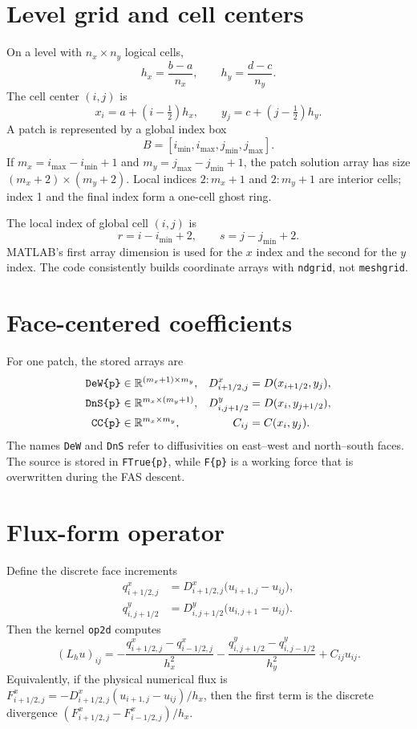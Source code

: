\documentclass[11pt,oneside,openany]{book}
\newcommand{\code}[1]{\textnormal{\texttt{#1}}}
\newcommand{\R}{\mathbb{R}}
\begin{document}
\section{Level grid and cell centers}
On a level with $n_x\times n_y$ logical cells,
\[
  h_x=\frac{b-a}{n_x},\qquad h_y=\frac{d-c}{n_y}.
\]
The cell center $(i,j)$ is
\[
  x_i=a+\left(i-\tfrac12\right)h_x,
  \qquad
  y_j=c+\left(j-\tfrac12\right)h_y.
\]
A patch is represented by a global index box
\[
  B=[i_{\min},i_{\max},j_{\min},j_{\max}].
\]
If $m_x=i_{\max}-i_{\min}+1$ and $m_y=j_{\max}-j_{\min}+1$, the patch solution array has size $(m_x+2)\times(m_y+2)$. Local indices $2{:}m_x+1$ and $2{:}m_y+1$ are interior cells; index 1 and the final index form a one-cell ghost ring.

The local index of global cell $(i,j)$ is
\[
  r=i-i_{\min}+2,\qquad s=j-j_{\min}+2.
\]
MATLAB's first array dimension is used for the $x$ index and the second for the $y$ index. The code consistently builds coordinate arrays with \code{ndgrid}, not \code{meshgrid}.

\section{Face-centered coefficients}
For one patch, the stored arrays are
\begin{align*}
  \code{DeW\{p\}} &\in\R^{(m_x+1)\times m_y},
  &D^x_{i+1/2,j}&=D(x_{i+1/2},y_j),\\
  \code{DnS\{p\}} &\in\R^{m_x\times(m_y+1)},
  &D^y_{i,j+1/2}&=D(x_i,y_{j+1/2}),\\
  \code{CC\{p\}} &\in\R^{m_x\times m_y},
  &C_{ij}&=C(x_i,y_j).
\end{align*}
The names \code{DeW} and \code{DnS} refer to diffusivities on east--west and north--south faces. The source is stored in \code{FTrue\{p\}}, while \code{F\{p\}} is a working force that is overwritten during the FAS descent.

\section{Flux-form operator}
Define the discrete face increments
\begin{align*}
  q^x_{i+1/2,j} &= D^x_{i+1/2,j}\bigl(u_{i+1,j}-u_{ij}\bigr),\\
  q^y_{i,j+1/2} &= D^y_{i,j+1/2}\bigl(u_{i,j+1}-u_{ij}\bigr).
\end{align*}
Then the kernel \code{op2d} computes
\begin{equation}
  (L_hu)_{ij}
  =-\frac{q^x_{i+1/2,j}-q^x_{i-1/2,j}}{h_x^2}
   -\frac{q^y_{i,j+1/2}-q^y_{i,j-1/2}}{h_y^2}
   +C_{ij}u_{ij}.
  \label{eq:discreteoperator}
\end{equation}
Equivalently, if the physical numerical flux is
$F^x_{i+1/2,j}=-D^x_{i+1/2,j}(u_{i+1,j}-u_{ij})/h_x$, then the first term is the discrete divergence $(F^x_{i+1/2,j}-F^x_{i-1/2,j})/h_x$.
\end{document}
